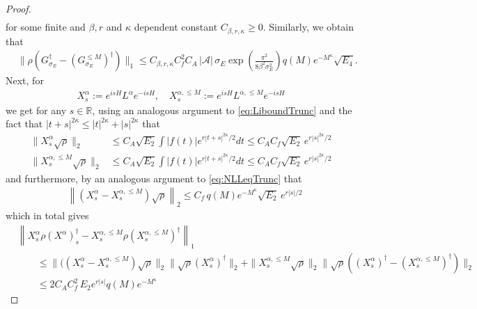 \documentclass[11pt]{amsart}
\newcommand{\1}{\mathbbm{1}}
\newcommand{\cA}{\mathcal{A}}
\newcommand{\bin}[1]{}
\theoremstyle{plain}
\theoremstyle{definition}
\theoremstyle{remark}
\numberwithin{equation}{section}
\begin{document}
\begin{proof}
\begin{align}
\end{align}
for some finite and $\beta,r$ and $\kappa$ dependent constant $C_{\beta,r,\kappa}\ge 0.$
Similarly, we obtain that 
\begin{align*}
    &\|\rho(G^{\dagger}_{\sigma_E}-\left(G^{\le M}_{\sigma_E}\right)^\dagger)\|_1\le C_{\beta,r,\kappa}C^2_fC_A\,|\cA|\,\sigma_E
\exp\!\left(\tfrac{\pi^2}{8\beta^2\sigma_E^2}\right)q(M)e^{-M^{\kappa}}\sqrt{E_4}.\end{align*}
Next, for 
\begin{align}
 X^\alpha_s:=e^{isH}L^{\alpha} e^{-isH}
,\quad  X^{\alpha,\le M}_s:=e^{isH}L^{\alpha,\le M} e^{-isH}\label{eq:XsaiTrunc}
\end{align}
we get for any $s\in\mathbb{R}$, using an analogous argument to \eqref{eq:LiboundTrunc} and the fact that $|t+s|^{2\kappa}\le |t|^{2\kappa}+|s|^{2\kappa}$ that 
\begin{align*}
\|X^{\alpha}_s\sqrt{\rho}\|_2 &\le C_A\sqrt{E_2} \int |f(t)| e^{r|t+s|^{2\kappa}/2}dt \le C_A C_f\sqrt{E_2} \,e^{r|s|^{2\kappa}/2}\\
    \|X^{\alpha,\le M}_s\sqrt{\rho}\|_2 &\le C_A\sqrt{E_2} \int |f(t)| e^{r|t+s|^{2\kappa}/2}dt\le C_AC_f\sqrt{E_2}\,e^{r|s|^{2\kappa}/2}
\end{align*}
and furthermore, by an analogous argument to \eqref{eq:NLLeqTrunc} that 
\begin{align*}
 &\left\|(X^{\alpha}_s-X^{\alpha,\le M}_s)\sqrt{\rho}\right\|_2\le C_f\,q(M)e^{-M^{\kappa}} \sqrt{E_2} \,e^{r|s|/2}
\end{align*}
which in total gives
\begin{align*}
&\left\|X^{\alpha}_s\rho (X^{\alpha})_s^\dagger-X^{\alpha,\le M}_s\rho(X^{\alpha,\le M}_s)^\dagger\right\|_1
\\&\qquad\le \|((X^{\alpha}_s-X^{\alpha,\le M}_s)\sqrt{\rho}\|_2\|\sqrt{\rho}(X^{\alpha}_s)^\dagger\|_2+ \|X^{\alpha,\le M}_s\sqrt{\rho}\|_2\|\sqrt{\rho}((X^{\alpha}_s)^\dagger-(X^{\alpha,\le M}_{s})^\dagger)\|_2
\\&\qquad\le 2C_AC^2_f\,E_2 e^{r|s|}q(M)e^{-M^{\kappa}}\,
\end{align*}
\bin{Now, by definition, the $X$ operators above correspond to operators $L$ with a shifted function $f_s(u)=f(u-s)$. Hence, the bounds derived in Lemma \ref{integralrepapprox} still hold, up to replacing all integrals of the form $\int |f(u)| C(|u|)du$ by
\begin{align*}
\sup_{s\in\mathbb{R}}\int |f(u-s)|C(|u|)du.
\end{align*}
}
\end{proof}
\end{document}
